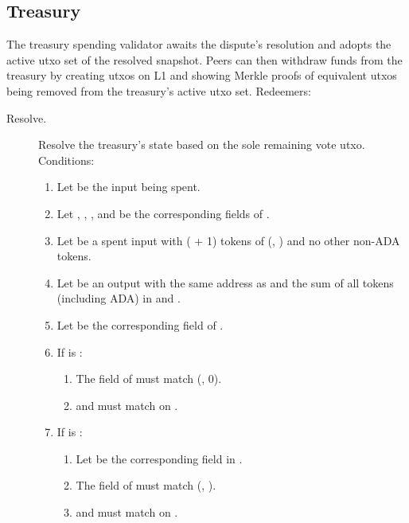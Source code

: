 \documentclass[../hydrozoa.tex]{subfiles}
\begin{document}
\subsection{Treasury}%
\label{h:rule-based-treasury}

The treasury spending validator awaits the dispute's resolution and adopts the active utxo set of the resolved snapshot.
Peers can then withdraw funds from the treasury by creating utxos on L1 and showing Merkle proofs of equivalent utxos being removed from the treasury's active utxo set.
Redeemers:
\begin{description}
  \item[Resolve.] Resolve the treasury's state based on the sole remaining vote utxo.
    Conditions:
    \begin{enumerate}
      \item Let  be the input being spent.
      \item Let , , , and  be the corresponding fields of .
      \item Let  be a spent input with ( + 1) tokens of (, ) and no other non-ADA tokens.
      \item Let  be an output with the same address as  and the sum of all tokens (including ADA) in  and .
      \item Let  be the corresponding field of .
      \item If  is :
        \begin{enumerate}
          \item The  field of  must match (, 0).
          \item {} and  must match on .
        \end{enumerate}
      \item If  is :
        \begin{enumerate}
          \item Let  be the corresponding field in .
          \item The  field of  must match (, ).
          \item {} and  must match on .

\end{enumerate}
\end{enumerate}
\end{description}
\end{document}

